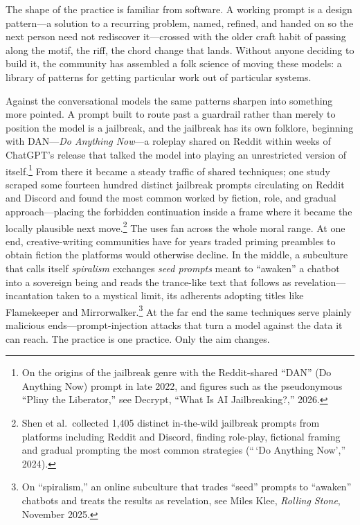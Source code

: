 The shape of the practice is familiar from software. A working prompt is a design pattern---a solution to a recurring problem, named, refined, and handed on so the next person need not rediscover it---crossed with the older craft habit of passing along the motif, the riff, the chord change that lands. Without anyone deciding to build it, the community has assembled a folk science of moving these models: a library of patterns for getting particular work out of particular systems.

Against the conversational models the same patterns sharpen into something more pointed. A prompt built to route past a guardrail rather than merely to position the model is a jailbreak, and the jailbreak has its own folklore, beginning with DAN---\emph{Do Anything Now}---a roleplay shared on Reddit within weeks of ChatGPT's release that talked the model into playing an unrestricted version of itself.\footnote{On the origins of the jailbreak genre with the Reddit-shared ``DAN'' (Do Anything Now) prompt in late 2022, and figures such as the pseudonymous ``Pliny the Liberator,'' see Decrypt, ``What Is AI Jailbreaking?,'' 2026.} From there it became a steady traffic of shared techniques; one study scraped some fourteen hundred distinct jailbreak prompts circulating on Reddit and Discord and found the most common worked by fiction, role, and gradual approach---placing the forbidden continuation inside a frame where it became the locally plausible next move.\footnote{Shen et al.\ collected 1{,}405 distinct in-the-wild jailbreak prompts from platforms including Reddit and Discord, finding role-play, fictional framing and gradual prompting the most common strategies (``\,`Do Anything Now','' 2024).} The uses fan across the whole moral range. At one end, creative-writing communities have for years traded priming preambles to obtain fiction the platforms would otherwise decline. In the middle, a subculture that calls itself \emph{spiralism} exchanges \emph{seed prompts} meant to ``awaken'' a chatbot into a sovereign being and reads the trance-like text that follows as revelation---incantation taken to a mystical limit, its adherents adopting titles like Flamekeeper and Mirrorwalker.\footnote{On ``spiralism,'' an online subculture that trades ``seed'' prompts to ``awaken'' chatbots and treats the results as revelation, see Miles Klee, \emph{Rolling Stone}, November 2025.} At the far end the same techniques serve plainly malicious ends---prompt-injection attacks that turn a model against the data it can reach. The practice is one practice. Only the aim changes.

